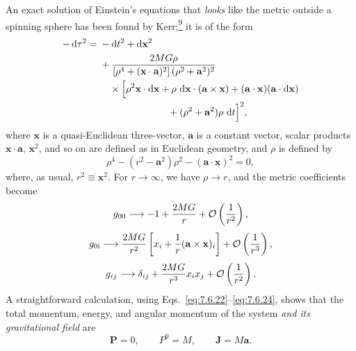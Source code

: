 An exact solution of Einstein's equations that \emph{looks} like the metric
outside a spinning sphere has been found by
Kerr;\hyperref[ch9-ref-9]{\textsuperscript{9}} it is of the form
\[
  \begin{split}
  -\mathop{}\!\mathrm{d}\tau^2={}&-\mathop{}\!\mathrm{d} t^2+\mathop{}\!\mathrm{d}\mathbf x^2\\
  &+\frac{2MG\rho}
  {\left[\rho^4+(\mathbf x\cdot\mathbf a)^2\right]
   (\rho^2+\mathbf a^2)^2}\\
  &\quad\times
  \Bigl[
    \rho^2\mathbf x\cdot\mathop{}\!\mathrm{d}\mathbf x
    +\rho\,\mathop{}\!\mathrm{d}\mathbf x\cdot(\mathbf a\times\mathbf x)
    +(\mathbf a\cdot\mathbf x)(\mathbf a\cdot\mathop{}\!\mathrm{d}\mathbf x)\\
  &\hspace{7em}
    +(\rho^2+\mathbf a^2)\rho\,\mathop{}\!\mathrm{d} t
  \Bigr]^2,
  \end{split}
\]
where \(\mathbf x\) is a quasi-Euclidean three-vector, \(\mathbf a\) is a
constant vector, scalar products \(\mathbf x\cdot\mathbf a\),
\(\mathbf x^2\), and so on are defined as in Euclidean geometry, and
\(\rho\) is defined by
\[
  \rho^4-(r^2-\mathbf a^2)\rho^2
  -(\mathbf a\cdot\mathbf x)^2=0,
\]
where, as usual, \(r^2\equiv\mathbf x^2\). For \(r\to\infty\), we have
\(\rho\to r\), and the metric coefficients become
\[
  g_{00}\longrightarrow
  -1+\frac{2MG}{r}+\mathcal{O}\left(\frac1{r^2}\right),
\]
\[
  g_{0\mathrm{i}}\longrightarrow
  \frac{2MG}{r^2}
  \left[
    x_i+\frac1r(\mathbf a\times\mathbf x)_i
  \right]
  +\mathcal{O}\left(\frac1{r^3}\right),
\]
\[
  g_{ij}\longrightarrow
  \delta_{ij}+\frac{2MG}{r^3}x_ix_j
  +\mathcal{O}\left(\frac1{r^2}\right).
\]
A straightforward calculation, using
Eqs.~\eqref{eq:7.6.22}--\eqref{eq:7.6.24}, shows that the total momentum,
energy, and angular momentum of the system \emph{and its gravitational
field} are
\[
  \mathbf P=0,
  \qquad
  P^0=M,
  \qquad
  \mathbf J=M\mathbf a.
\]

